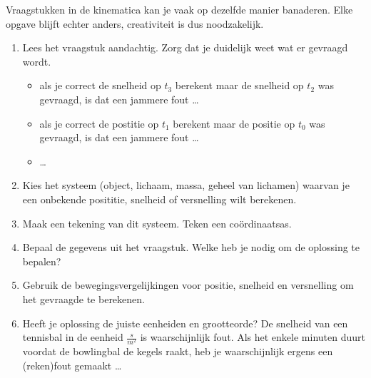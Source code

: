 \documentclass{ximera}
\begin{document}
	\author{Bart Lambregs}
    \xmsource\xmuitleg



Vraagstukken in de kinematica kan je vaak op dezelfde manier banaderen. Elke opgave blijft echter anders, creativiteit is dus noodzakelijk.

\begin{enumerate}
\item Lees het vraagstuk aandachtig. Zorg dat je duidelijk weet wat er gevraagd wordt. 
\begin{itemize}
	\item als je correct de snelheid op \(t_3\) berekent maar de snelheid op \(t_2\) was gevraagd, is dat een jammere fout \ldots 
	\item als je correct de postitie op \(t_1\) berekent maar de positie op \(t_0\) was gevraagd, is dat een jammere fout \ldots 
	\item \ldots
\end{itemize}
\item Kies het systeem (object, lichaam, massa, geheel van lichamen) waarvan je een onbekende posititie, snelheid of versnelling wilt berekenen. 
\item Maak een tekening van dit systeem. Teken een coördinaatsas. 
\item Bepaal de gegevens uit het vraagstuk. Welke heb je nodig om de oplossing te bepalen? 
\item Gebruik de bewegingsvergelijkingen voor positie, snelheid en versnelling om het gevraagde te berekenen. 
\item Heeft je oplossing de juiste eenheiden en grootteorde? De snelheid van een tennisbal in de eenheid \(\frac{s}{m^2}\) is waarschijnlijk fout. Als het enkele minuten duurt voordat de bowlingbal de kegels raakt, heb je waarschijnlijk ergens een (reken)fout gemaakt \ldots 

\end{enumerate}



\end{document}
